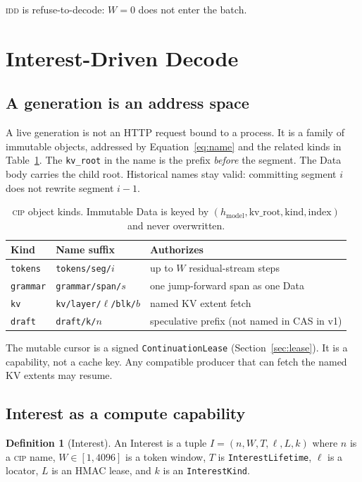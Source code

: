 \documentclass{article}
\theoremstyle{definition}
\newtheorem{definition}{Definition}
\newcommand{\cip}{\textsc{cip}}
\newcommand{\idd}{\textsc{idd}}
\newcommand{\kvroot}{\texttt{kv\_root}}
\begin{document}
\idd{} is refuse-to-decode: $W{=}0$ does not enter the batch.

\section{Interest-Driven Decode}
\label{sec:idd}

\subsection{A generation is an address space}

A live generation is not an HTTP request bound to a process.
It is a family of immutable objects, addressed by Equation~\ref{eq:name} and the related kinds in Table~\ref{tab:kinds}.
The \kvroot{} in the name is the prefix \emph{before} the segment.
The Data body carries the child root.
Historical names stay valid: committing segment $i$ does not rewrite segment $i{-}1$.

\begin{table}[t]
\centering
\small
\caption{\cip{} object kinds. Immutable Data is keyed by $(h_{\mathrm{model}}, \mathrm{kv\_root}, \mathrm{kind}, \mathrm{index})$ and never overwritten.}
\label{tab:kinds}
\begin{tabular}{lll}
\toprule
Kind & Name suffix & Authorizes \\
\midrule
\texttt{tokens} & \texttt{tokens/seg/}$i$ & up to $W$ residual-stream steps \\
\texttt{grammar} & \texttt{grammar/span/}$s$ & one jump-forward span as one Data \\
\texttt{kv} & \texttt{kv/layer/}$\ell$\texttt{/blk/}$b$ & named KV extent fetch \\
\texttt{draft} & \texttt{draft/k/}$n$ & speculative prefix (not named in CAS in v1) \\
\bottomrule
\end{tabular}
\end{table}

The mutable cursor is a signed \texttt{ContinuationLease} (Section~\ref{sec:lease}).
It is a capability, not a cache key.
Any compatible producer that can fetch the named KV extents may resume.

\subsection{Interest as a compute capability}

\begin{definition}[Interest]
An Interest is a tuple $I = (n, W, T, \ell, L, k)$ where $n$ is a \cip{} name, $W \in [1, 4096]$ is a token window, $T$ is \texttt{InterestLifetime}, $\ell$ is a locator, $L$ is an HMAC lease, and $k$ is an \texttt{InterestKind}.
\end{definition}
\end{document}
